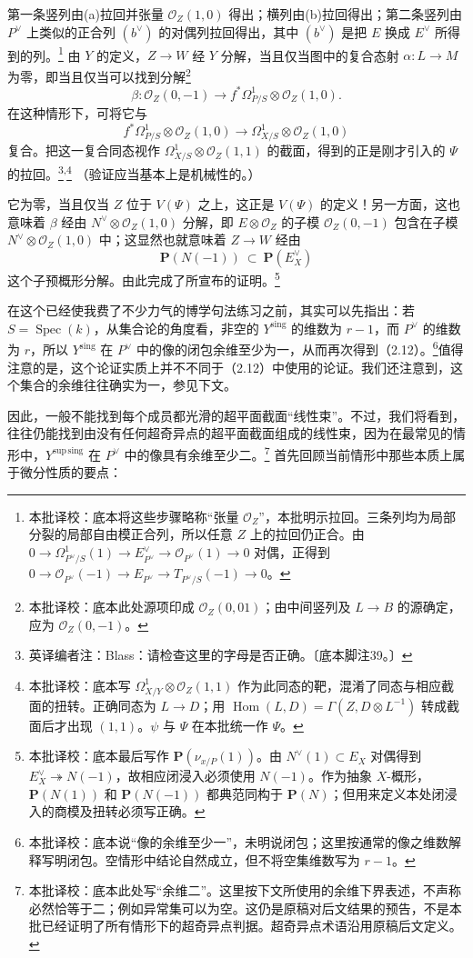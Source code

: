 \documentclass{ctexbook}
\newcommand{\ednote}[1]{\footnote{英译编者注：#1}}
\newcommand{\corr}[1]{\footnote{本批译校：#1}}
\newcommand{\cO}{\mathcal O}
\newcommand{\Spec}{\operatorname{Spec}}
\begin{document}
第一条竖列由(a)拉回并张量 $\cO_Z(1,0)$ 得出；横列由(b)拉回得出；第二条竖列由 $P^\vee$ 上类似的正合列 $(b^\vee)$ 的对偶列拉回得出，其中 $(b^\vee)$ 是把 $E$ 换成 $E^\vee$ 所得到的列。\corr{底本将这些步骤略称“张量 $\cO_Z$”，本批明示拉回。三条列均为局部分裂的局部自由模正合列，所以任意 $Z$ 上的拉回仍正合。由 $0\to\Omega^1_{P^\vee/S}(1)\to E^\vee_{P^\vee}\to\cO_{P^\vee}(1)\to0$ 对偶，正得到 $0\to\cO_{P^\vee}(-1)\to E_{P^\vee}\to T_{P^\vee/S}(-1)\to0$。}
由 $Y$ 的定义，$Z\to W$ 经 $Y$ 分解，当且仅当图中的复合态射 $\alpha:L\to M$ 为零，即当且仅当可以找到分解\corr{底本此处源项印成 $\cO_Z(0,01)$；由中间竖列及 $L\to B$ 的源确定，应为 $\cO_Z(0,-1)$。}
\[
\beta:\cO_Z(0,-1)\longrightarrow
f^*\Omega^1_{P/S}\otimes\cO_Z(1,0).
\]
在这种情形下，可将它与
\[
f^*\Omega^1_{P/S}\otimes\cO_Z(1,0)
\longrightarrow\Omega^1_{X/S}\otimes\cO_Z(1,0)
\]
复合。把这一复合同态视作 $\Omega^1_{X/S}\otimes\cO_Z(1,1)$ 的截面，得到的正是刚才引入的 $\Psi$ 的拉回。\ednote{Blass：请检查这里的字母是否正确。〔底本脚注39。〕}\textsuperscript{,}\corr{底本写 $\Omega^1_{X/Y}\otimes\cO_Z(1,1)$ 作为此同态的靶，混淆了同态与相应截面的扭转。正确同态为 $L\to D$；用 $\operatorname{Hom}(L,D)=\Gamma(Z,D\otimes L^{-1})$ 转成截面后才出现 $(1,1)$。$\psi$ 与 $\Psi$ 在本批统一作 $\Psi$。}
（验证应当基本上是机械性的。）

它为零，当且仅当 $Z$ 位于 $V(\Psi)$ 之上，这正是 $V(\Psi)$ 的定义！另一方面，这也意味着 $\beta$ 经由 $N^\vee\otimes\cO_Z(1,0)$ 分解，即 $E\otimes\cO_Z$ 的子模 $\cO_Z(0,-1)$ 包含在子模 $N^\vee\otimes\cO_Z(1,0)$ 中；这显然也就意味着 $Z\to W$ 经由
\[
\mathbf P(N(-1))\ \subset\ \mathbf P(E_X^\vee)
\]
这个子预概形分解。由此完成了所宣布的证明。\corr{底本最后写作 $\mathbf P(\nu_{x/P}(1))$。由 $N^\vee(1)\subset E_X$ 对偶得到 $E_X^\vee\twoheadrightarrow N(-1)$，故相应闭浸入必须使用 $N(-1)$。作为抽象 $X$-概形，$\mathbf P(N(1))$ 和 $\mathbf P(N(-1))$ 都典范同构于 $\mathbf P(N)$；但用来定义本处闭浸入的商模及扭转必须写正确。}

在这个已经使我费了不少力气的博学句法练习之前，其实可以先指出：若 $S=\Spec(k)$，从集合论的角度看，非空的 $Y^{\mathrm{sing}}$ 的维数为 $r-1$，而 $P^\vee$ 的维数为 $r$，所以 $Y^{\mathrm{sing}}$ 在 $P^\vee$ 中的像的闭包余维至少为一，从而再次得到（2.12）。\corr{底本说“像的余维至少一”，未明说闭包；这里按通常的像之维数解释写明闭包。空情形中结论自然成立，但不将空集维数写为 $r-1$。}值得注意的是，这个论证实质上并不不同于（2.12）中使用的论证。我们还注意到，这个集合的余维往往确实为一，参见下文。

因此，一般不能找到每个成员都光滑的超平面截面“线性束”。不过，我们将看到，往往仍能找到由没有任何超奇异点的超平面截面组成的线性束，因为在最常见的情形中，$Y^{\mathrm{sup\,sing}}$ 在 $P^\vee$ 中的像具有余维至少二。\corr{底本此处写“余维二”。这里按下文所使用的余维下界表述，不声称必然恰等于二；例如异常集可以为空。这仍是原稿对后文结果的预告，不是本批已经证明了所有情形下的超奇异点判据。超奇异点术语沿用原稿后文定义。}
首先回顾当前情形中那些本质上属于微分性质的要点：
\end{document}
